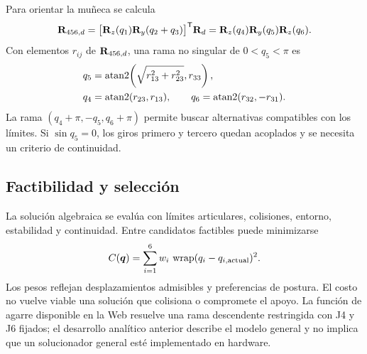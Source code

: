 Para orientar la muñeca se calcula
\begin{equation}
\mathbf{R}_{456,d}=\bigl[\mathbf{R}_z(q_1)\mathbf{R}_y(q_2+q_3)\bigr]^{\mathsf{T}}\mathbf{R}_d
=\mathbf{R}_z(q_4)\mathbf{R}_y(q_5)\mathbf{R}_z(q_6).
\end{equation}
Con elementos $r_{ij}$ de $\mathbf{R}_{456,d}$, una rama no singular de $0<q_5<\pi$ es
\begin{align}
q_5&=\operatorname{atan2}\!\left(\sqrt{r_{13}^2+r_{23}^2},r_{33}\right),\\
q_4&=\operatorname{atan2}(r_{23},r_{13}),\qquad
q_6=\operatorname{atan2}(r_{32},-r_{31}).
\end{align}
La rama $(q_4+\pi,-q_5,q_6+\pi)$ permite buscar alternativas compatibles con los límites. Si $\sin q_5=0$, los giros primero y tercero quedan acoplados y se necesita un criterio de continuidad.

\subsection{Factibilidad y selección}
La solución algebraica se evalúa con límites articulares, colisiones, entorno, estabilidad y continuidad. Entre candidatos factibles puede minimizarse
\begin{equation}
C(\boldsymbol{q})=\sum_{i=1}^6w_i\,\operatorname{wrap}(q_i-q_{i,\mathrm{actual}})^2.
\end{equation}
Los pesos reflejan desplazamientos admisibles y preferencias de postura. El costo no vuelve viable una solución que colisiona o compromete el apoyo. La función de agarre disponible en la Web resuelve una rama descendente restringida con J4 y J6 fijados; el desarrollo analítico anterior describe el modelo general y no implica que un solucionador general esté implementado en hardware.

